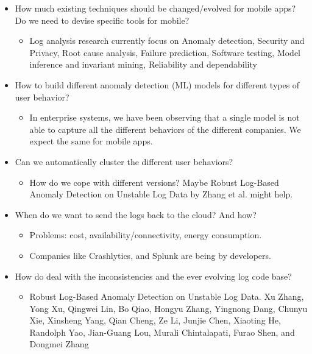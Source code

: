 \documentclass[a4paper]{article}
\begin{document}
\begin{itemize}
\tightlist
\item
  How much existing techniques should be changed/evolved for mobile
  apps? Do we need to devise specific tools for mobile?
  \begin{itemize}
    \tightlist
    \item Log analysis research currently focus on Anomaly detection, Security and Privacy, Root cause analysis, Failure prediction, Software testing, Model inference and invariant mining, Reliability and dependability
  \end{itemize} 
\item
  How to build different anomaly detection (ML) models for different
  types of user behavior?
    \begin{itemize}
    \tightlist
    \item In enterprise systems, we have been observing that a single model is not able to capture all the different behaviors of the different
  companies. We expect the same for mobile apps.
  \end{itemize}  
\item
  Can we automatically cluster the different user behaviors?
    \begin{itemize}
    \tightlist
    \item How do we cope with different versions? Maybe Robust Log-Based Anomaly Detection on Unstable Log Data by
    Zhang et al. might help.
  \end{itemize}  
\item
  When do we want to send the logs back to the cloud? And how?
    \begin{itemize}
    \tightlist
    \item Problems: cost, availability/connectivity, energy consumption.
    \item Companies like Crashlytics, and Splunk are being by developers.
    \end{itemize}
\item
  How do deal with the inconsistencies and the ever evolving log code
  base?
    \begin{itemize}
    \tightlist
    \item Robust Log-Based Anomaly Detection on Unstable Log Data. Xu Zhang,
  Yong Xu, Qingwei Lin, Bo Qiao, Hongyu Zhang, Yingnong Dang, Chunyu
  Xie, Xinsheng Yang, Qian Cheng, Ze Li, Junjie Chen, Xiaoting He,
  Randolph Yao, Jian-Guang Lou, Murali Chintalapati, Furao Shen, and
  Dongmei Zhang
    \end{itemize}

\end{itemize}
\end{document}
